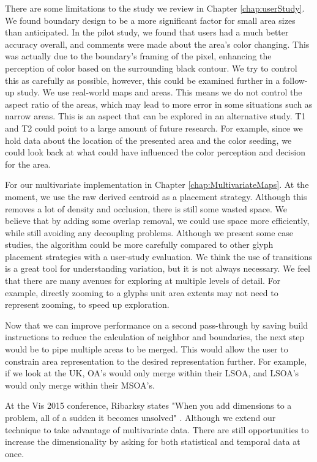 There are some limitations to the study we review in Chapter \ref{chap:userStudy}. We found boundary design to be a more significant factor for small area sizes than anticipated. In the pilot study, we found that users had a much better accuracy overall, and comments were made about the area's color changing. This was actually due to the boundary's framing of the pixel, enhancing the perception of color based on the surrounding black contour. We try to control this as carefully as possible, however, this could be examined further in a follow-up study. We use real-world maps and areas. This means we do not control the aspect ratio of the areas, which may lead to more error in some situations such as narrow areas. This is an aspect that can be explored in an alternative study. T1 and T2 could point to a large amount of future research. For example, since we hold data about the location of the presented area and the color seeding, we could look back at what could have influenced the color perception and decision for the area.

For our multivariate implementation in Chapter \ref{chap:MultivariateMaps}. At the moment, we use the raw derived centroid as a placement strategy. Although this removes a lot of density and occlusion, there is still some wasted space. We believe that by adding some overlap removal, we could use space more efficiently, while still avoiding any decoupling problems. Although we present some case studies, the algorithm could be more carefully compared to other glyph placement strategies with a user-study evaluation. We think the use of transitions is a great tool for understanding variation, but it is not always necessary. We feel that there are many avenues for exploring at multiple levels of detail. For example, directly zooming to a glyphs unit area extents may not need to represent zooming, to speed up exploration.

Now that we can improve performance on a second pass-through by saving build instructions to reduce the calculation of neighbor and boundaries, the next step would be to pipe multiple areas to be merged. This would allow the user to constrain area representation to the desired representation further. For example, if we look at the UK, OA's would only merge within their LSOA, and LSOA's would only merge within their MSOA's.

At the Vis 2015 conference, Ribarksy states "When you add dimensions to a problem, all of a sudden it becomes unsolved" \cite{ribarsky2015solved}. Although we extend our technique to take advantage of multivariate data. There are still opportunities to increase the dimensionality by asking for both statistical and temporal data at once.

